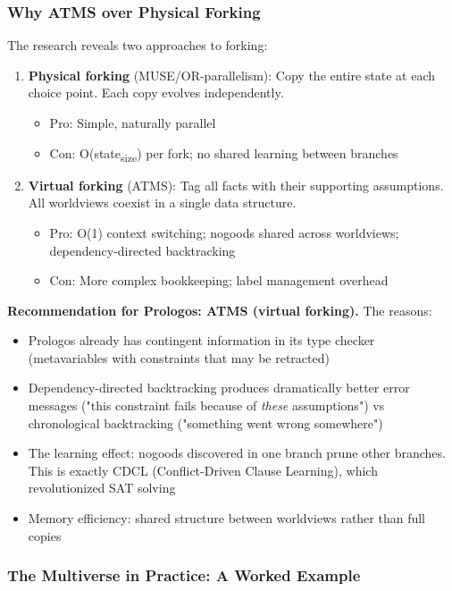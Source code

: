 \documentclass[11pt]{article}
\begin{document}
\subsubsection{Why ATMS over Physical Forking}
\label{sec:org192bd1f}

The research reveals two approaches to forking:

\begin{enumerate}
\item \textbf{Physical forking} (MUSE/OR-parallelism): Copy the entire state at each
choice point. Each copy evolves independently.
\begin{itemize}
\item Pro: Simple, naturally parallel
\item Con: O(state\textsubscript{size}) per fork; no shared learning between branches
\end{itemize}

\item \textbf{Virtual forking} (ATMS): Tag all facts with their supporting assumptions.
All worldviews coexist in a single data structure.
\begin{itemize}
\item Pro: O(1) context switching; nogoods shared across worldviews;
dependency-directed backtracking
\item Con: More complex bookkeeping; label management overhead
\end{itemize}
\end{enumerate}

\textbf{Recommendation for Prologos: ATMS (virtual forking).} The reasons:

\begin{itemize}
\item Prologos already has contingent information in its type checker
(metavariables with constraints that may be retracted)
\item Dependency-directed backtracking produces dramatically better error messages
("this constraint fails because of \emph{these} assumptions") vs chronological
backtracking ("something went wrong somewhere")
\item The learning effect: nogoods discovered in one branch prune other branches.
This is exactly CDCL (Conflict-Driven Clause Learning), which
revolutionized SAT solving
\item Memory efficiency: shared structure between worldviews rather than
full copies
\end{itemize}
\subsubsection{The Multiverse in Practice: A Worked Example}
\label{sec:orgdcb8294}
\end{document}

